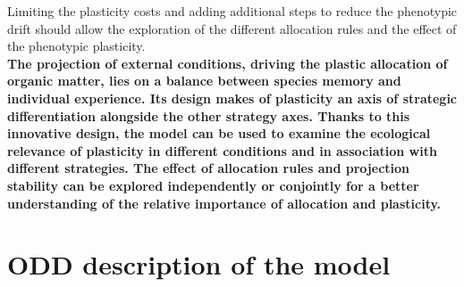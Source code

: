 Limiting the plasticity costs and adding additional steps to reduce the phenotypic drift should allow the exploration of the different allocation rules and the effect of the phenotypic plasticity.\\
 
 
\textbf{The projection of external conditions, driving the plastic allocation of organic matter, lies on a balance between species memory and individual experience. Its design makes of plasticity an axis of strategic differentiation alongside the other strategy axes. Thanks to this innovative design, the model can be used to examine the ecological relevance of plasticity in different conditions and in association with different strategies. The effect of allocation rules and projection stability can be explored independently or conjointly for a better understanding of the relative importance of allocation and plasticity.}




\chapter{ODD description of the model \model}\label{chapter:model-description}





